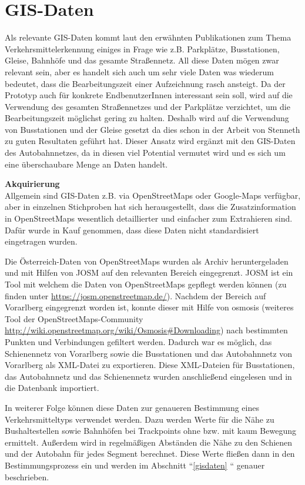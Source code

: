 
\section{GIS-Daten}
Als relevante GIS-Daten kommt laut den erwähnten Publikationen zum Thema Verkehrsmittelerkennung einiges in Frage wie z.B. Parkplätze, Busstationen, Gleise, Bahnhöfe und das gesamte Straßennetz. All diese Daten mögen zwar relevant sein, aber es handelt sich auch um sehr viele Daten was wiederum bedeutet, dass die Bearbeitungszeit einer Aufzeichnung rasch ansteigt. Da der Prototyp auch für konkrete EndbenutzerInnen interessant sein soll, wird auf die Verwendung des gesamten Straßennetzes und der Parkplätze verzichtet, um die Bearbeitungszeit möglichst gering zu halten. Deshalb wird auf die Verwendung von Busstationen und der Gleise gesetzt da dies schon in der Arbeit von Stenneth \cite{stenneth_transportation_2011} zu guten Resultaten geführt hat. Dieser Ansatz wird ergänzt mit den GIS-Daten des Autobahnnetzes, da in diesen viel Potential vermutet wird und es sich um eine überschaubare Menge an Daten handelt.

\textbf{Akquirierung}\\
Allgemein sind GIS-Daten z.B. via OpenStreetMaps oder Google-Maps verfügbar, aber in einzelnen Stichproben hat sich herausgestellt, dass die Zusatzinformation in OpenStreetMaps wesentlich detaillierter und einfacher zum Extrahieren sind. Dafür wurde in Kauf genommen, dass diese Daten nicht standardisiert eingetragen wurden.

Die Österreich-Daten von OpenStreetMaps wurden als Archiv heruntergeladen und mit Hilfen von JOSM auf den relevanten Bereich eingegrenzt. JOSM ist ein Tool mit welchem die Daten von OpenStreetMaps gepflegt werden können (zu finden unter \url{https://josm.openstreetmap.de/}). Nachdem der Bereich auf Vorarlberg eingegrenzt worden ist, konnte dieser mit Hilfe von osmosis (weiteres Tool der OpenStreetMaps-Community \url{http://wiki.openstreetmap.org/wiki/Osmosis#Downloading}) nach bestimmten Punkten und Verbindungen gefiltert werden. Dadurch war es möglich, das Schienennetz von Vorarlberg sowie die Busstationen und das Autobahnnetz von Vorarlberg als XML-Datei zu exportieren. Diese XML-Dateien für Busstationen, das Autobahnnetz und das Schienennetz wurden anschließend eingelesen und in die Datenbank importiert. 

In weiterer Folge können diese Daten zur genaueren Bestimmung eines Verkehrsmitteltyps verwendet werden. Dazu werden Werte für die Nähe zu Bushaltestellen sowie Bahnhöfen bei Trackpoints ohne bzw. mit kaum Bewegung ermittelt. Außerdem wird in regelmäßigen Abständen die Nähe zu den Schienen und der Autobahn für jedes Segment berechnet. Diese Werte fließen dann in den Bestimmungsprozess ein und werden im Abschnitt ``\ref{gisdaten} `` genauer beschrieben.

